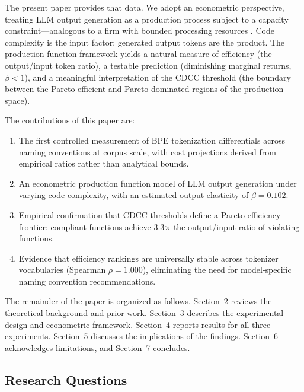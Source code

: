 \documentclass[11pt,a4paper]{article}
\begin{document}
The present paper provides that data. We adopt an econometric perspective,
treating LLM output generation as a production process subject to a capacity
constraint---analogous to a firm with bounded processing resources
\citep{simon1955,varian1992}. Code complexity is the input factor; generated
output tokens are the product. The production function framework yields a
natural measure of efficiency (the output/input token ratio), a testable
prediction (diminishing marginal returns, $\beta < 1$), and a meaningful
interpretation of the CDCC threshold (the boundary between the Pareto-efficient
and Pareto-dominated regions of the production space).

The contributions of this paper are:
\begin{enumerate}
  \item The first controlled measurement of BPE tokenization differentials
    across naming conventions at corpus scale, with cost projections derived
    from empirical ratios rather than analytical bounds.
  \item An econometric production function model of LLM output generation
    under varying code complexity, with an estimated output elasticity of
    $\beta = 0.102$.
  \item Empirical confirmation that CDCC thresholds define a Pareto efficiency
    frontier: compliant functions achieve 3.3$\times$ the output/input ratio
    of violating functions.
  \item Evidence that efficiency rankings are universally stable across
    tokenizer vocabularies (Spearman $\rho = 1.000$), eliminating the need
    for model-specific naming convention recommendations.
\end{enumerate}

The remainder of the paper is organized as follows. Section~2 reviews the
theoretical background and prior work. Section~3 describes the experimental
design and econometric framework. Section~4 reports results for all three
experiments. Section~5 discusses the implications of the findings. Section~6
acknowledges limitations, and Section~7 concludes.

\subsection{Research Questions}
\end{document}
